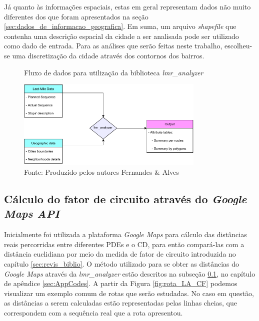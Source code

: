 Já quanto às informações espaciais, estas em geral representam dados não muito diferentes dos que foram apresentados na seção \ref{sec:dados_de_informacao_geografica}.
%
Em suma, um arquivo \textit{\textit{shapefile}} que contenha uma descrição espacial da cidade a ser analisada pode ser utilizado como dado de entrada.
%
Para as análises que serão feitas neste trabalho, escolheu-se uma discretização da cidade através dos contornos dos bairros.

\begin{figure}[H]
    \centering
    \caption{Fluxo de dados para utilização da biblioteca \textit{lmr\_analyzer}}
    \includegraphics[width=0.8\textwidth]{images/4_materiais/lmr_analyzer/flowchart.pdf}
    \caption*{Fonte: Produzido pelos autores Fernandes \& Alves}
    \label{fig:flowchart}
\end{figure}


\subsection{Cálculo do fator de circuito através do \textit{Google Maps API}} \label{sec:codigosmaps}

Inicialmente foi utilizada a plataforma \textit{Google Maps} para cálculo das distâncias reais percorridas entre diferentes PDEs e o CD, para então compará-las com a distância euclidiana por meio da medida de fator de circuito introduzida no capítulo \ref{sec:revis_biblio}. 
%
O método utilizado para se obter as distâncias do \textit{Google Maps} através da \textit{lmr\_analyzer} estão descritos na subseção \ref{sec:codigosmaps}, no capítulo de apêndice \ref{sec:AppCodes}.
%
A partir da Figura \ref{fig:rota_LA_CF} podemos visualizar um exemplo comum de rotas que serão estudadas.
No caso em questão, as distâncias a serem calculadas estão representadas pelas linhas cheias, que correspondem com a sequência real que a rota apresentou.

